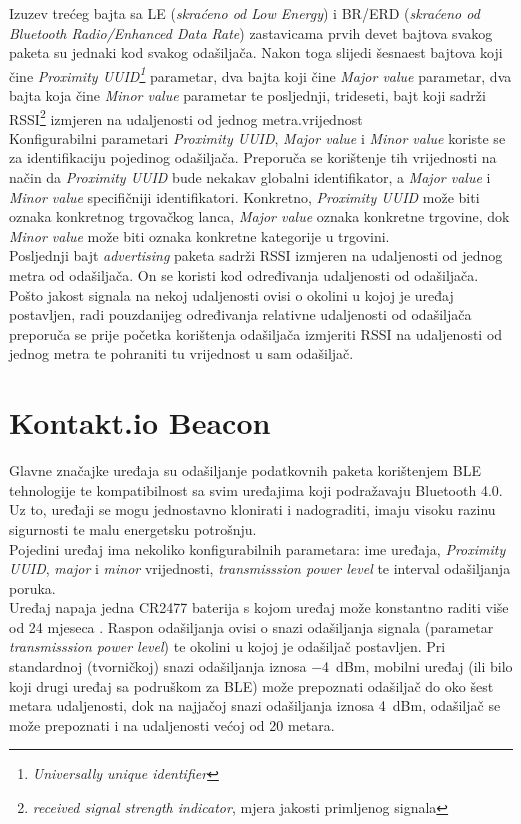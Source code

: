 Izuzev trećeg bajta sa LE (\textit{skraćeno od Low Energy}) i BR/ERD (\textit{skraćeno od Bluetooth Radio/Enhanced Data Rate}) zastavicama prvih devet bajtova svakog paketa su jednaki kod svakog odašiljača. 
Nakon toga slijedi šesnaest bajtova koji čine \textit{Proximity UUID\footnote{\textit{Universally unique identifier}}} parametar, dva bajta koji čine \textit{Major value} parametar, dva bajta koja čine \textit{Minor value} parametar te posljednji, trideseti, bajt koji sadrži RSSI\footnote{\textit{received signal strength indicator}, mjera jakosti primljenog signala} izmjeren na udaljenosti od jednog metra.vrijednost
\\
Konfigurabilni parametari \textit{Proximity UUID}, \textit{Major value} i \textit{Minor value} koriste se za identifikaciju pojedinog odašiljača. 
Preporuča se korištenje tih vrijednosti na način da \textit{Proximity UUID} bude nekakav globalni identifikator, a \textit{Major value} i \textit{Minor value} specifičniji identifikatori. 
Konkretno, \textit{Proximity UUID} može biti oznaka konkretnog trgovačkog lanca, \textit{Major value} oznaka konkretne trgovine, dok \textit{Minor value} može biti oznaka konkretne kategorije u trgovini.
\\
Posljednji bajt \textit{advertising} paketa sadrži RSSI izmjeren na udaljenosti od jednog metra od odašiljača. 
On se koristi kod određivanja udaljenosti od odašiljača. 
Pošto jakost signala na nekoj udaljenosti ovisi o okolini u kojoj je uređaj postavljen, radi pouzdanijeg određivanja relativne udaljenosti od odašiljača preporuča se prije početka korištenja odašiljača izmjeriti RSSI na udaljenosti od jednog metra te pohraniti tu vrijednost u sam odašiljač.

\section*{Kontakt.io Beacon}

Glavne značajke uređaja su odašiljanje podatkovnih paketa korištenjem BLE tehnologije te kompatibilnost sa svim uređajima koji podražavaju Bluetooth 4.0. 
Uz to, uređaji se mogu jednostavno klonirati i nadograditi, imaju visoku razinu sigurnosti te malu energetsku potrošnju.
\\
Pojedini uređaj ima nekoliko konfigurabilnih parametara: ime uređaja, \textit{Proximity UUID}, \textit{major} i \textit{minor} vrijednosti, \textit{transmisssion power level} te interval odašiljanja poruka.
\\
Uređaj napaja jedna CR2477 baterija s kojom uređaj može konstantno raditi više od 24 mjeseca \citep{kontaktDatasheet}. 
Raspon odašiljanja ovisi o snazi odašiljanja signala (parametar \textit{transmisssion power level}) te okolini u kojoj je odašiljač postavljen. 
Pri standardnoj (tvorničkoj) snazi odašiljanja iznosa \SI{-4}{dBm}, mobilni uređaj (ili bilo koji drugi uređaj sa podruškom za BLE) može prepoznati odašiljač do oko šest metara udaljenosti, dok na najjačoj snazi odašiljanja iznosa \SI{4}{dBm}, odašiljač se može prepoznati i na udaljenosti većoj od 20 metara.

